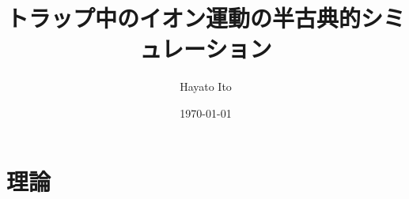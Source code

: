 \documentclass[a4paper,11pt]{article}
\title{トラップ中のイオン運動の半古典的シミュレーション}
\author{Hayato Ito}
\date{\today}
\begin{document}
    \maketitle

    
    \section{理論}
    

    
\end{document}
